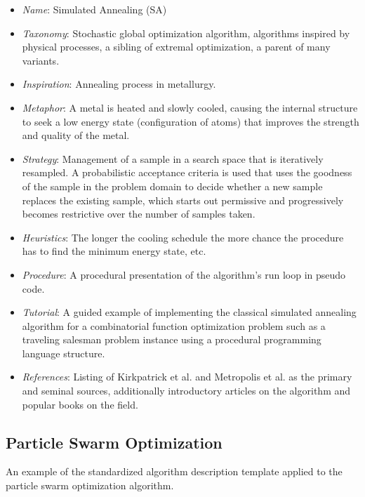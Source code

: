 \documentclass[a4paper, 11pt]{article}
\begin{document}
\begin{itemize}
	\item \emph{Name}: Simulated Annealing (SA)
	\item \emph{Taxonomy}: Stochastic global optimization algorithm, algorithms inspired by physical processes, a sibling of extremal optimization, a parent of many variants. 
	\item \emph{Inspiration}: Annealing process in metallurgy. 
	\item \emph{Metaphor}: A metal is heated and slowly cooled, causing the internal structure to seek a low energy state (configuration of atoms) that improves the strength and quality of the metal. 
	\item \emph{Strategy}: Management of a sample in a search space that is iteratively resampled. A probabilistic acceptance criteria is used that uses the goodness of the sample in the problem domain to decide whether a new sample replaces the existing sample, which starts out permissive and progressively becomes restrictive over the number of samples taken. 
	\item \emph{Heuristics}: The longer the cooling schedule the more chance the procedure has to find the minimum energy state, etc.
	\item \emph{Procedure}: A procedural presentation of the algorithm's run loop in pseudo code.
	\item \emph{Tutorial}: A guided example of implementing the classical simulated annealing algorithm for a combinatorial function optimization problem such as a traveling salesman problem instance using a procedural programming language structure.
	\item \emph{References}: Listing of Kirkpatrick et al. and Metropolis et al. as the primary and seminal sources, additionally introductory articles on the algorithm and popular books on the field.
\end{itemize}

\subsection{Particle Swarm Optimization}
An example of the standardized algorithm description template applied to the particle swarm optimization algorithm.
\end{document}
